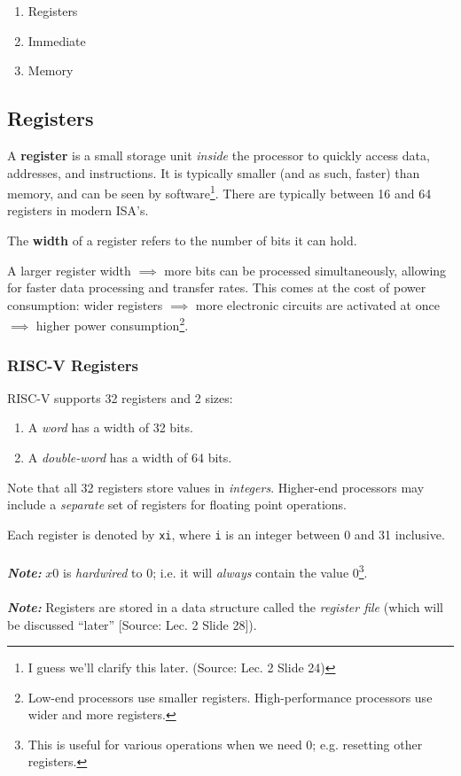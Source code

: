 \documentclass{report}
\newcommand{\definition}[2]{\begin{tcolorbox}[title={Definition: #1}]{#2}\end{tcolorbox}}
\newcommand{\aside}[2]{\begin{tcolorbox}[colback=orange!5!white,colframe=black!75!orange,title={Aside:
      #1}]{#2}\end{tcolorbox}}
\begin{document}
\begin{enumerate}[label=\textit{(\roman*)}]
\item Registers
\item Immediate
\item Memory
\end{enumerate}


\subsection{Registers}
\definition{Register}{
  A \textbf{register} is a small storage unit \textit{inside} the processor to quickly access data,
  addresses, and instructions. It is typically smaller (and as such, faster) than memory, and can be
  seen by software\footnote{I guess we'll clarify this later. (Source: Lec. 2 Slide 24)}. There are
  typically between 16 and 64 registers in modern ISA's.
}

\definition{Register Width}{
  The \textbf{width} of a register refers to the number of bits it can hold.
}

A larger register width $\implies$ more bits can be processed simultaneously, allowing for faster
data processing and transfer rates. This comes at the cost of power consumption: wider registers
$\implies$ more electronic circuits are activated at once $\implies$ higher power
consumption\footnote{Low-end processors use smaller registers. High-performance processors use wider
  and more registers.}.


\subsubsection{RISC-V Registers}
RISC-V supports 32 registers and 2 sizes:

\begin{enumerate}[label=\textit{(\roman*)}]
\item A \textit{word} has a width of 32 bits.
\item A \textit{double-word} has a width of 64 bits.
\end{enumerate}

\aside{Floating Point Registers}{
  Note that all 32 registers store values in \textit{integers}. Higher-end processors may include a
  \textit{separate} set of registers for floating point operations.
}
Each register is denoted by \texttt{xi}, where \texttt{i} is an integer between 0 and 31 inclusive. \\ \\
\textbf{\textit{Note:}} $x0$ is \textit{hardwired} to 0; i.e. it will \textit{always} contain the
value 0\footnote{This is useful for various operations when we need 0; e.g. resetting other
  registers.}. \\ \\
\textbf{\textit{Note:}} Registers are stored in a data structure called the \textit{register file}
(which will be discussed ``later'' [Source: Lec. 2 Slide 28]).
\end{document}
